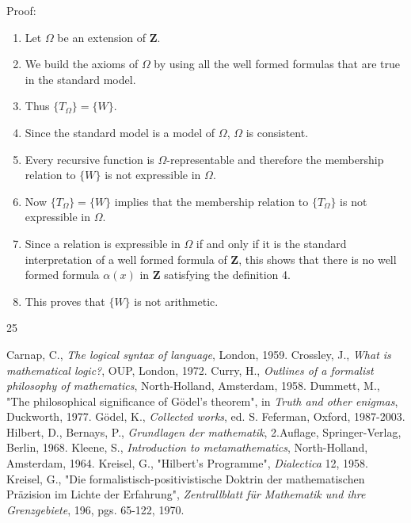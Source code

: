 \documentclass[12pt]{article}
\begin{document}
Proof:
\begin{enumerate}
\item Let $\Omega$ be an extension of \textbf{Z}.

\item We build the axioms of $\Omega$ by using all the well formed formulas that are true in the standard model.

\item Thus $\{ T_{\Omega} \} = \{ W \}.$

\item Since the standard model is a model of $\Omega$, $\Omega$ is consistent.

\item Every recursive function is $\Omega$-representable and therefore the membership relation to $\{ W \}$ is not expressible in $\Omega$.

\item Now $\{ T_{\Omega} \} = \{ W \}$ implies that the membership relation to $\{ T_{\Omega} \}$ is not expressible in $\Omega$.

\item Since a relation is expressible in $\Omega$ if and only if it is the standard interpretation of a well formed formula of \textbf{Z}, this shows that there is no well formed formula $\alpha (x)$ in \textbf{Z} satisfying the definition 4.

\item This proves that $\{ W \}$ is not arithmetic.
\end{enumerate}

\begin{thebibliography} {25}

 Carnap, C., \emph{The logical syntax of language}, London, 1959.
 Crossley, J., \emph{What is mathematical logic?}, OUP, London, 1972.
 Curry, H., \emph{Outlines of a formalist philosophy of mathematics}, North-Holland, Amsterdam, 1958.
 Dummett, M., "The philosophical significance of G\"{o}del's theorem", in \emph{Truth and other enigmas}, Duckworth, 1977.
 G\"{o}del, K., \emph{Collected works}, ed. S. Feferman, Oxford, 1987-2003.
 Hilbert, D., Bernays, P., \emph{Grundlagen der mathematik}, 2.Auflage, Springer-Verlag, Berlin, 1968.
 Kleene, S., \emph{Introduction to metamathematics}, North-Holland, Amsterdam, 1964.
 Kreisel, G., "Hilbert's Programme", \emph{Dialectica} 12, 1958.
 Kreisel, G., "Die formalistisch-positivistische Doktrin der mathematischen Pr\"{a}zision im Lichte der Erfahrung", \emph{Zentrallblatt f\"{u}r Mathematik und ihre Grenzgebiete}, 196, pgs. 65-122, 1970. 

\end{thebibliography}
\end{document}
